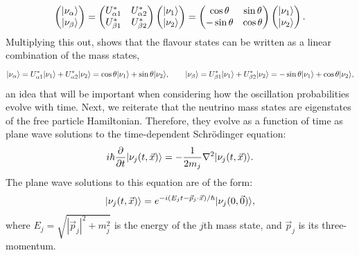 \begin{equation}
    \begin{pmatrix} \lvert \nu_\alpha \rangle \\ \lvert \nu_\beta \rangle \end{pmatrix}
    =
    \begin{pmatrix} U^{*}_{\alpha 1} & U^{*}_{\alpha 2} \\ U^{*}_{\beta 1} & U^{*}_{\beta 2} \end{pmatrix}
    \begin{pmatrix} \lvert \nu_1 \rangle \\ \lvert \nu_2 \rangle \end{pmatrix}
    =
    \begin{pmatrix} \cos\theta & \sin\theta \\ -\sin\theta & \cos\theta \end{pmatrix}
    \begin{pmatrix} \lvert \nu_1 \rangle \\ \lvert \nu_2 \rangle \end{pmatrix}.
    \label{eq:two-flavour-mixing-matrix}
\end{equation}
Multiplying this out, shows that the flavour states can be written as a linear combination of the mass states, 
\begin{equation}
    \lvert \nu_\alpha \rangle = U^{*}_{\alpha 1}\lvert \nu_1 \rangle + U^{*}_{\alpha 2}\lvert \nu_2 \rangle
    = \cos\theta \lvert \nu_1 \rangle + \sin\theta \lvert \nu_2 \rangle,
    \qquad
    \lvert \nu_\beta \rangle = U^{*}_{\beta 1}\lvert \nu_1 \rangle + U^{*}_{\beta 2}\lvert \nu_2 \rangle
    = -\sin\theta \lvert \nu_1 \rangle + \cos\theta \lvert \nu_2 \rangle,
    \label{eq:two-flavour-mixing}
\end{equation}
an idea that will be important when considering how the oscillation probabilities evolve with time.
Next, we reiterate that the neutrino mass states are eigenstates of the free particle Hamiltonian. Therefore, they evolve as a function of time as plane wave solutions to the time-dependent Schrödinger equation:
\begin{equation}
    i\hbar \frac{\partial}{\partial t} \lvert \nu_j(t,\vec{x}) \rangle = - \frac{1}{2m_j} \nabla^2 \lvert \nu_j(t,\vec{x}) \rangle.
    \label{eq:time-dependent-schrodinger}
\end{equation}
The plane wave solutions to this equation are of the form:
\begin{equation}
    \lvert \nu_j(t,\vec{x}) \rangle = e^{-i(E_j t - \vec{p}_j\cdot\vec{x})/\hbar} \lvert \nu_j(0,\vec{0}) \rangle,
    \label{eq:plane-wave-solution}
\end{equation}
where $E_j = \sqrt{|\vec{p}_j|^{2} + m_j^{2}}$ is the energy of the $j$th mass state, and $\vec{p}_j$ is its three-momentum.
 

